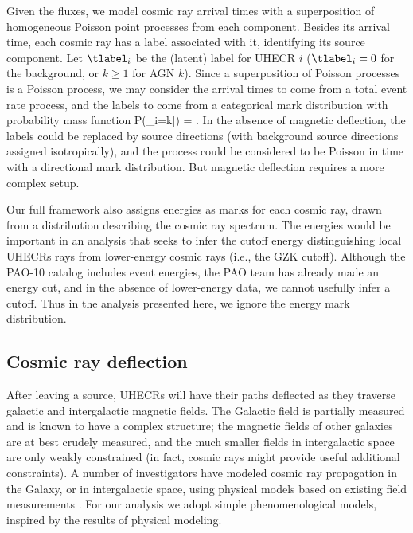 Given the fluxes, we model cosmic ray arrival times with a superposition of
homogeneous Poisson point processes from each component.  Besides its
arrival time, each cosmic ray has a label associated with it, identifying
its source component.  Let $\tlabel_i$ be the (latent) label for UHECR
$i$ ($\tlabel_i = 0$ for the background, or $k \ge 1$ for AGN $k$).  Since
a superposition of Poisson processes is a Poisson process, we may consider
the arrival times to come from a total event rate process, and the labels
to come from a categorical mark distribution with probability mass function
\be
P(\lambda_i=k|\Fvec) = .
\label{label-pmf}
\ee
In the absence of magnetic deflection, the labels could be replaced by
source directions (with background source directions assigned
isotropically), and the process could be considered to be Poisson in time
with a directional mark distribution.  But magnetic deflection requires a
more complex setup.

Our full framework also assigns energies as marks for each cosmic ray, drawn
from a distribution describing the cosmic ray spectrum.  The energies would
be important in an analysis that seeks to infer the cutoff energy
distinguishing local UHECRs rays from lower-energy cosmic rays (i.e., the
GZK cutoff).  Although the PAO-10 catalog includes event energies, the PAO
team has already made an energy cut, and in the absence of lower-energy
data, we cannot usefully infer a cutoff.  Thus in the analysis presented
here, we ignore the energy mark distribution.

\subsection{Cosmic ray deflection}

After leaving a source, UHECRs will have their paths deflected as they
traverse galactic and intergalactic magnetic fields.  The Galactic field is
partially measured and is known to have a complex structure; the magnetic
fields of other galaxies are at best crudely measured, and the much smaller
fields in intergalactic space are only weakly constrained (in fact, cosmic
rays might provide useful additional constraints).  A number of
investigators have modeled cosmic ray propagation in the Galaxy, or in
intergalactic space, using physical models based on existing field
measurements \cite{2010A&A...523A..49N,PhysRevD.82.043002,2010ApJ...719..459J}.
For our analysis we adopt simple
phenomenological models, inspired by the results of physical modeling.

